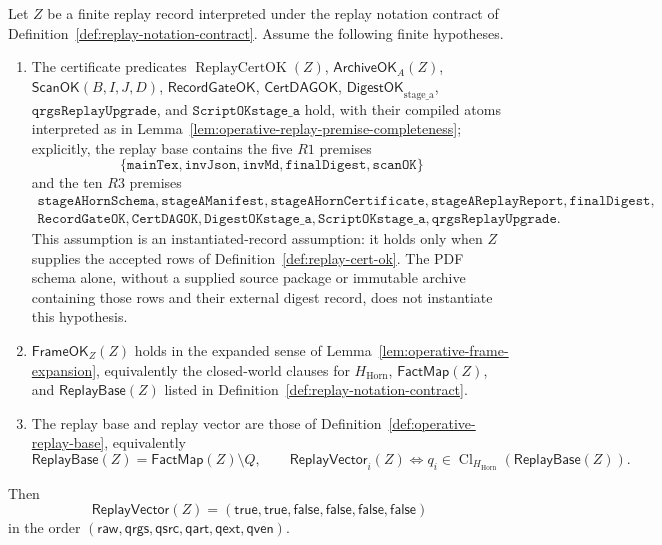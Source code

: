 \documentclass[runningheads]{llncs}
\newcommand{\ScanOK}{\mathsf{ScanOK}}
\newcommand{\RecordGateOK}{\mathsf{RecordGateOK}}
\newcommand{\CertDAGOK}{\mathsf{CertDAGOK}}
\newcommand{\DigestOKstageA}{\mathsf{DigestOK}_{\mathrm{stage\_a}}}
\newcommand{\ArchiveOKA}{\mathsf{ArchiveOK}_{A}}
\newcommand{\FactMap}{\mathsf{FactMap}}
\newcommand{\ReplayVector}{\mathsf{ReplayVector}}
\newcommand{\ReplayBase}{\mathsf{ReplayBase}}
\newcommand{\FrameOKZ}{\mathsf{FrameOK}_{Z}}
\newcommand{\HHorn}{H_{\mathrm{Horn}}}
\newcommand{\ClHHorn}{\operatorname{Cl}_{\HHorn}}
\begin{document}
\begin{theorem}
\label{thm:operative-replay-closure}
Let \(Z\) be a finite replay record interpreted under the replay notation
contract of Definition~\ref{def:replay-notation-contract}.  Assume the following
finite hypotheses.
\begin{enumerate}
\item The certificate predicates
\(\operatorname{ReplayCertOK}(Z)\), \(\ArchiveOKA(Z)\),
\(\ScanOK(B,I,J,D)\), \(\RecordGateOK\), \(\CertDAGOK\),
\(\DigestOKstageA\), \(\texttt{qrgsReplayUpgrade}\), and
\(\texttt{ScriptOKstage\_a}\) hold, with their compiled atoms interpreted as in
Lemma~\ref{lem:operative-replay-premise-completeness}; explicitly, the replay
base contains the five \(R1\) premises
\[
\{\texttt{mainTex},\texttt{invJson},\texttt{invMd},
\texttt{finalDigest},\texttt{scanOK}\}
\]
and the ten \(R3\) premises
\[
\begin{gathered}
\texttt{stageAHornSchema},\texttt{stageAManifest},
\texttt{stageAHornCertificate},\texttt{stageAReplayReport},
\texttt{finalDigest},\\
\texttt{RecordGateOK},\texttt{CertDAGOK},
\texttt{DigestOKstage\_a},\texttt{ScriptOKstage\_a},
\texttt{qrgsReplayUpgrade}.
\end{gathered}
\]
This assumption is an instantiated-record assumption: it holds only when \(Z\)
supplies the accepted rows of Definition~\ref{def:replay-cert-ok}.  The PDF
schema alone, without a supplied source package or immutable archive containing
those rows and their external digest record, does not instantiate this
hypothesis.
\item \(\FrameOKZ(Z)\) holds in the expanded sense of
Lemma~\ref{lem:operative-frame-expansion}, equivalently the closed-world clauses
for \(\HHorn\), \(\FactMap(Z)\), and \(\ReplayBase(Z)\) listed in
Definition~\ref{def:replay-notation-contract}.
\item The replay base and replay vector are those of
Definition~\ref{def:operative-replay-base}, equivalently
\[
\ReplayBase(Z)=\FactMap(Z)\setminus Q,
\qquad
\ReplayVector_i(Z)\Longleftrightarrow
q_i\in\ClHHorn(\ReplayBase(Z)).
\]
\end{enumerate}
Then
\[
\ReplayVector(Z)=(\mathsf{true},\mathsf{true},\mathsf{false},
\mathsf{false},\mathsf{false},\mathsf{false})
\]
in the order
\((\mathsf{raw},\mathsf{qrgs},\mathsf{qsrc},\mathsf{qart},\mathsf{qext},
\mathsf{qven})\).
\end{theorem}
\end{document}
